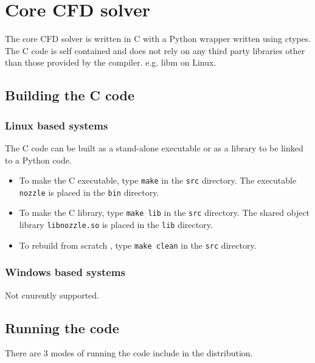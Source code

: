 %
\section{Core CFD solver}
\label{sec-corecfd}

The core CFD solver is written in C with a Python wrapper written using ctypes.
The C code is self contained and does not rely on any third party libraries other
than those provided by the compiler. e.g. libm on Linux.


%
\subsection{Building the C code}
\label{subsec-buildc}


\subsubsection{Linux based systems}
The C code can be built as a stand-alone executable or as a library to be linked to a Python code.

\begin{itemize}
\item To make the C executable, type {\tt make} in the {\tt src} directory.
The executable {\tt nozzle} is placed in the {\tt bin} directory.

\item To make the C library, type {\tt make lib} in the {\tt src} directory.
The shared object library {\tt libnozzle.so} is placed in the {\tt lib} directory.

\item To rebuild from scratch , type  {\tt make clean} in the {\tt src} directory.
\end{itemize}


\subsubsection{Windows based systems}

Not cuurently supported.



%
\subsection{Running the code}
\label{subsec-run}

There are 3 modes of running the code include in the distribution.

